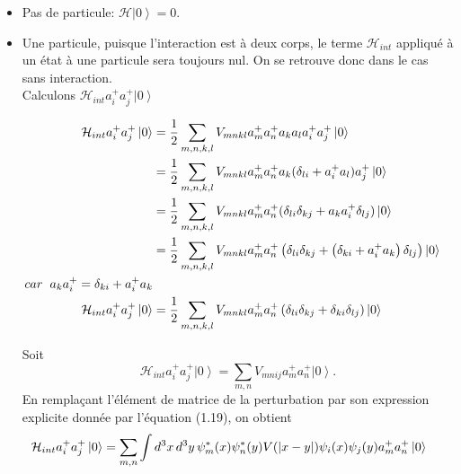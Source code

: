 \documentclass[12pt,a4paper, openany]{report}
\begin{document}
\begin{flushleft}
\begin{itemize}
\begin{flushleft}
\begin{itemize}
		\item Pas de particule: $\mathcal{H}\left|0\right\rangle=0 $.\\

		\item Une particule, puisque l’interaction est à deux corps, le terme $\mathcal{H}_{int}$ appliqué à un état à une particule sera toujours nul. On se retrouve donc dans le cas sans interaction.\\ Calculons $\mathcal{H}_{int}a_i^{+}a_j^{+}\left|0\right\rangle$ \\
\begin{center}
	$\left.\begin{aligned}
		\mathcal{H}_{int}a_i^{+}a_j^{+}\left|0\right\rangle&=\frac{1}{2}\sum_{m,n,k,l}V_{mnkl}a^{+}_ma^{+}_na_ka_la_i^{+}a_j^{+}\left|0\right\rangle \\
		&=\frac{1}{2}\sum_{m,n,k,l}V_{mnkl}a^{+}_ma^{+}_na_k(\delta_{li}+a^
		{+}_ia_l)a^{+}_j\left|0\right\rangle \\
		&=\frac{1}{2}\sum_{m,n,k,l}V_{mnkl}a^{+}_ma^{+}_n(\delta_{li}\delta_{kj}+a_ka^{+}_i\delta_{lj})\left|0\right\rangle \\
		&=\frac{1}{2}\sum_{m,n,k,l}V_{mnkl}a^{+}_ma^{+}_n\left(\delta_{li}\delta_{kj}+\left(\delta_{ki}+a^{+}_ia_k\right)\delta_{lj}\right)\left|0\right\rangle \hspace{0.1cm} \\ car\hspace{0.2cm} a_ka^{+}_i=\delta_{ki}+a^{+}_ia_k \\
		\mathcal{H}_{int}a_i^{+}a_j^{+}\left|0\right\rangle	&=\frac{1}{2}\sum_{m,n,k,l}V_{mnkl}a^{+}_ma^{+}_n\left(\delta_{li}\delta_{kj}+\delta_{ki}\delta_{lj}\right)\left|0\right\rangle \\
	\end{aligned}\right.$
\end{center}
Soit 
\begin{equation}	
	\mathcal{H}_{int}a_i^{+}a_j^{+}\left|0\right\rangle=\sum_{m,n}V_{mnij}a^{+}_ma^{+}_n\left|0\right\rangle.
\end{equation}
En remplaçant  l'élément de matrice de la perturbation par son expression explicite donnée par l'équation (1.19), on obtient 
\begin{equation}
	\hspace{-0.5cm}	\mathcal{H}_{int}a_i^{+}a_j^{+}\left|0\right\rangle=\sum_{m,n}\int d^{3}x\,d^{3}y\,\psi_m^{*}(x)\psi_n^{*}(y)V(\left|x-y\right|){\psi}_i(x){\psi}_j(y)a_m^{+}a_n^{+}\left|0\right\rangle
\end{equation}

\end{itemize}
\end{flushleft}
\end{itemize}
\end{flushleft}
\end{document}
